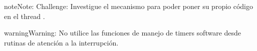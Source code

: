 \documentclass[letterpaper,10pt,english]{sphinxmanual}
\begin{document}
\begin{sphinxadmonition}{note}{Note:}
\sphinxAtStartPar
Challenge: Investigue el mecanismo para poder poner su propio código en el thread .
\end{sphinxadmonition}

\begin{sphinxadmonition}{warning}{Warning:}
\sphinxAtStartPar
No utilice las funciones de manejo de timers software desde rutinas de atención a la interrupción.
\end{sphinxadmonition}



\renewcommand{\indexname}{Index}
\printindex
\end{document}

